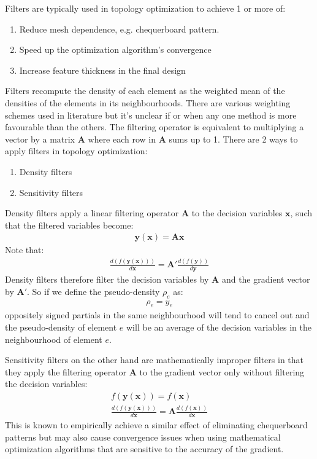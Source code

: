 Filters are typically used in topology optimization to achieve 1 or more of:
\begin{enumerate}
    \item Reduce mesh dependence, e.g. chequerboard pattern.
    \item Speed up the optimization algorithm's convergence
    \item Increase feature thickness in the final design
\end{enumerate}
Filters recompute the density of each element as the weighted mean of the densities of the elements in its neighbourhoods. There are various weighting schemes used in literature but it's unclear if or when any one method is more favourable than the others. The filtering operator is equivalent to multiplying a vector by a matrix $\bm{A}$ where each row in $\bm{A}$ sums up to 1. There are 2 ways to apply filters in topology optimization:
\begin{enumerate}
    \item Density filters
    \item Sensitivity filters
\end{enumerate}
Density filters apply a linear filtering operator $\bm{A}$ to the decision variables $\bm{x}$, such that the filtered variables become:
\begin{align}
    \bm{y}(\bm{x}) = \bm{A} \bm{x}
\end{align}
Note that:
\begin{align}
    \frac{d(f(\bm{y}(\bm{x})))}{d\bm{x}} = \bm{A}' \frac{d(f(\bm{y}))}{d\bm{y}}
\end{align}
Density filters therefore filter the decision variables by $\bm{A}$ and the gradient vector by $\bm{A}'$. So if we define the pseudo-density $\rho_e$ as:
\begin{align}
    \rho_e = y_e
\end{align}
oppositely signed partials in the same neighbourhood will tend to cancel out and the pseudo-density of element $e$ will be an average of the decision variables in the neighbourhood of element $e$.

Sensitivity filters on the other hand are mathematically improper filters in that they apply the filtering operator $\bm{A}$ to the gradient vector only without filtering the decision variables:
\begin{align}
    f(\bm{y}(\bm{x})) = f(\bm{x}) \\
    \frac{d(f(\bm{y}(\bm{x})))}{d\bm{x}} = \bm{A} \frac{d(f(\bm{x}))}{d\bm{x}}
\end{align}
This is known to empirically achieve a similar effect of eliminating chequerboard patterns but may also cause convergence issues when using mathematical optimization algorithms that are sensitive to the accuracy of the gradient.

